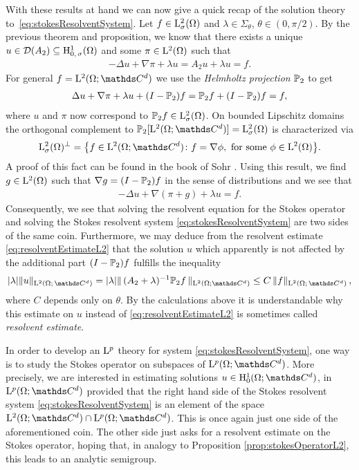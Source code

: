 With these results at hand we can now give a quick recap of the solution theory to~\eqref{eq:stokesResolventSystem}.
Let $f \in \mathrm{L}^2_\sigma(\Omega)$ and $\lambda \in \Sigma_\theta$, $\theta \in (0, \pi/2)$.
By the previous theorem and proposition, we know that there exists a unique $u \in \mathcal{D}(A_2) \subseteq \mathrm{H}^1_{0,\,\sigma}(\Omega)$ and some $\pi \in \mathrm{L}^2(\Omega)$ such that
\begin{align*}
  -\Delta u + \nabla \pi + \lambda u = A_2 u + \lambda u = f.
\end{align*}
For general $f = \Ell^2(\Omega; \C^d)$ we use the \emph{Helmholtz projection} $\mathbb{P}_2$ to get
\begin{align*}
  \Delta u + \nabla \pi + \lambda u + (I - \mathbb{P}_2) f = \mathbb{P}_2 f + (I - \mathbb{P}_2) f = f,
\end{align*}
where $u$ and $\pi$ now correspond to $\mathbb{P}_2 f \in \mathrm{L}^2_\sigma(\Omega)$. On bounded Lipschitz domains the orthogonal complement to $\PP_2[\Ell^2(\Omega; \C^d)] = \Ell^2_\sigma(\Omega)$ is characterized via
\begin{align*}
  \Ell^2_\sigma(\Omega)^\perp = \big\{ f \in \Ell^2(\Omega; \C^d) \colon f = \nabla \phi, \text{ for some } \phi \in \Ell^2(\Omega) \big\}.
\end{align*}
A proof of this fact can be found in the book of Sohr \cite[Lem.\@~2.5.3]{sohr}.
Using this result, we find $g \in \mathrm{L}^2(\Omega)$ such that $\nabla g = (I - \mathbb{P}_2)f$ in the sense of distributions and we see that
\begin{align*}
  -\Delta u + \nabla( \pi + g ) + \lambda u = f.
\end{align*}
Consequently, we see that solving the resolvent equation for the Stokes operator and solving the Stokes resolvent system \eqref{eq:stokesResolventSystem} are two sides of the same coin.
Furthermore, we may deduce from the resolvent estimate \eqref{eq:resolventEstimateL2} that the solution $u$ which apparently is not affected by the additional part $(I-\mathbb{P}_2)f$ fulfills the inequality
\begin{align*}
  |\lambda| \| u\|_{\Ell^2(\Omega; \,\C^d)} 
  = |\lambda| \|\,(A_2 + \lambda)^{-1} \PP_2 f \,\|_{\Ell^2(\Omega; \C^d)} 
  \leq C\, \| f \|_{\Ell^2(\Omega;\, \C^d)}\,,
\end{align*}
where $C$ depends only on $\theta$.
By the calculations above it is understandable why this estimate on $u$ instead of \eqref{eq:resolventEstimateL2} is sometimes called \emph{resolvent estimate}.

In order to develop an $\mathrm{L}^p$ theory for system \eqref{eq:stokesResolventSystem}, one way is to study the Stokes operator on subspaces of $\Ell^p(\Omega; \C^d)$.
More precisely, we are interested in estimating solutions $u \in \HH^1_0(\Omega; \C^d)$, in $\Ell^p(\Omega; \C^d)$ provided that the right hand side of the Stokes resolvent system \eqref{eq:stokesResolventSystem} is an element of the space $\Ell^2(\Omega; \C^d) \cap \Ell^p(\Omega; \C^d)$.
This is once again just one side of the aforementioned coin. 
The other side just asks for a resolvent estimate on the Stokes operator, hoping that, in analogy to Proposition \ref{prop:stokesOperatorL2}, this leads to an analytic semigroup.

